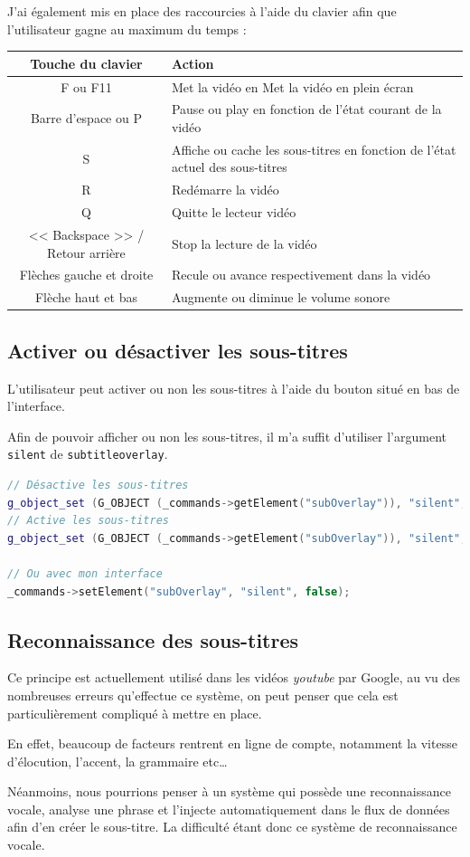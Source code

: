 \documentclass[a4paper, 11pt]{article}
\begin{document}
	J'ai également mis en place des raccourcies à l'aide du clavier afin que l'utilisateur gagne au maximum du temps : 

	\begin{tabular}{c|p{10cm}}
		\textbf{Touche du clavier} & \textbf{Action}\\
		\hline
		F ou F11& Met la vidéo en Met la vidéo en plein écran\\
		\hline
		Barre d'espace ou P&Pause ou play en fonction de l'état courant de la vidéo\\
		\hline
		S&Affiche ou cache les sous-titres en fonction de l'état actuel des sous-titres\\
		\hline
		R&Redémarre la vidéo\\
		\hline
		Q&Quitte le lecteur vidéo\\
		\hline
		<< Backspace >> / Retour arrière &Stop la lecture de la vidéo \\
		\hline
		Flèches gauche et droite&Recule ou avance respectivement dans la vidéo\\
		\hline
		Flèche haut et bas & Augmente ou diminue le volume sonore\\
		\hline
	\end{tabular}
	\subsection{Activer ou désactiver les sous-titres}
	L'utilisateur peut activer ou non les sous-titres à l'aide du bouton situé en bas de l'interface. 

	Afin de pouvoir afficher ou non les sous-titres, il m'a suffit d'utiliser l'argument \texttt{silent} de \texttt{subtitleoverlay}.
	\begin{lstlisting}[language=C++, caption=Affichage ou non des sous-titres]
// Désactive les sous-titres
g_object_set (G_OBJECT (_commands->getElement("subOverlay")), "silent", false, NULL); 
// Active les sous-titres
g_object_set (G_OBJECT (_commands->getElement("subOverlay")), "silent", true, NULL); 

// Ou avec mon interface
_commands->setElement("subOverlay", "silent", false);

	\end{lstlisting}

	\subsection{Reconnaissance des sous-titres}
	Ce principe est actuellement utilisé dans les vidéos \textit{youtube} par Google, au vu des nombreuses erreurs qu'effectue ce système, on peut penser que
	cela est particulièrement compliqué à mettre en place.

	En effet, beaucoup de facteurs rentrent en ligne de compte, notamment la vitesse d'élocution, l'accent, la grammaire etc…

	Néanmoins, nous pourrions penser à un système qui possède une reconnaissance vocale, analyse une phrase et l'injecte automatiquement dans le flux de données
	afin d'en créer le sous-titre. La difficulté étant donc ce système de reconnaissance vocale.
	\appendix
	\lstlistoflistings
	\listoffigures
	
\end{document}
